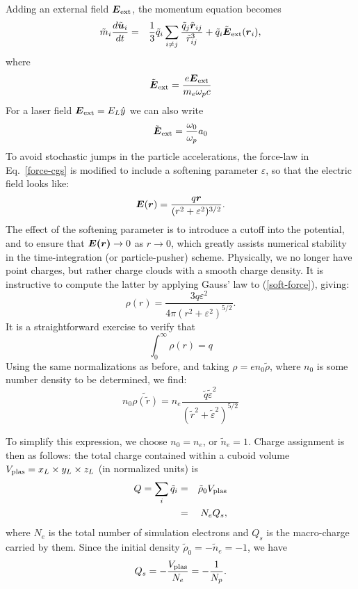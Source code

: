 \documentclass[11pt,psfig]{article}
\def\be{\begin{equation}}
\def\ee{\end{equation}}
\def\bea{\begin{eqnarray}}
\def\eea{\end{eqnarray}}
\newcommand{\bm}[1]{\mbox{\boldmath$#1$}}
\newcommand{\ddt}[1]{\frac{d #1}{d t}}
\newcommand{\downbox}[1]{_{\mbox{\scriptsize\rm #1}}}
\begin{document}
Adding an external field $\bm{E}\downbox{ext}$, the momentum equation becomes
\bea
\tilde{m}_i \ddt{\tilde{\bm{u}}_i} 
    &=& \frac{1}{3}\tilde{q}_i\sum_{i \neq j}
    \frac{\tilde{q}_j\tilde{\bm{r}}_{ij}}{\tilde{r}_{ij}^3}
+ \tilde{q}_i \tilde{\bm{E}}\downbox{ext}(\bm{r}_{i}),
\label{force-norm}
\eea
where 
$$
\tilde{\bm{E}}\downbox{ext} = \frac{e\bm{E}\downbox{ext}}{m_e\omega_p c}
$$
For a laser field $\bm{E}\downbox{ext}=E_L\hat{y}$ we can also write
$$
\tilde{\bm{E}}\downbox{ext} = \frac{\omega_0}{\omega_p} a_0
$$
To avoid stochastic jumps in the particle accelerations, the force-law in Eq.~\ref{force-cgs} is modified to include a softening parameter $\varepsilon$,
so that the electric field looks like:
\be
\bm{E}(\bm{r}) = \frac{q\bm{r}}{(r^2+\varepsilon^2)^{3/2}}.
\label{soft-force}
\ee 
The effect of the softening parameter is to introduce a cutoff into the
potential, and to ensure that $\bm{E(r)}\rightarrow 0$ as $r\rightarrow 0$,
which greatly assists numerical stability in the time-integration 
(or particle-pusher) scheme.   Physically, we no longer have point charges, but
rather charge clouds with a smooth charge density.  It is
instructive to compute the latter by applying Gauss' law to
(\ref{soft-force}), giving:
\be  
\rho(r) = \frac{3q\varepsilon^2}{4\pi(r^2+\varepsilon^2)^{5/2}}.
\label{soft-rho}
\ee  
It is a straightforward exercise to verify that
$$
\int_0^\infty \rho(r) = q
$$
Using the same normalizations as before, and taking $\rho = en_0\tilde{\rho}$,
where $n_0$ is some number density to be determined, we find:
\be
n_0 \tilde{\rho(\tilde{r})} = n_e \frac{\tilde{q}\tilde{\varepsilon}^2}
{(\tilde{r}^2+\tilde{\varepsilon}^2)^{5/2}}
\ee

To simplify this expression, we choose $n_0 = n_e$, or $\tilde{n}_e = 1$.
Charge assignment is then as follows:  the total charge
contained within a cuboid volume $V\downbox{plas}=x_L\times y_L\times z_L$ (in normalized
units) is 
\bea
Q = \sum_i \tilde{q}_i &=& \tilde{\rho}_0 V\downbox{plas} \nonumber\\
&=& N_e Q_s, \nonumber
\eea
where $N_e$ is the total number of simulation electrons and $Q_s$ is the
macro-charge carried by them.  Since the initial density
$\tilde{\rho}_0=-\tilde{n}_e = -1$, we have
\be
Q_s = -\frac{V\downbox{plas}}{N_e} = -\frac{1}{N_p}.
\label{charge-ass}
\ee
\end{document}

